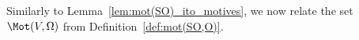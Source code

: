%    
%
%

Similarly to Lemma~\ref{lem:mot(SO)_ito_motives}, we now relate the set $\Mot(V,\Omega)$ from Definition~\ref{def:mot(SO,O)}.

